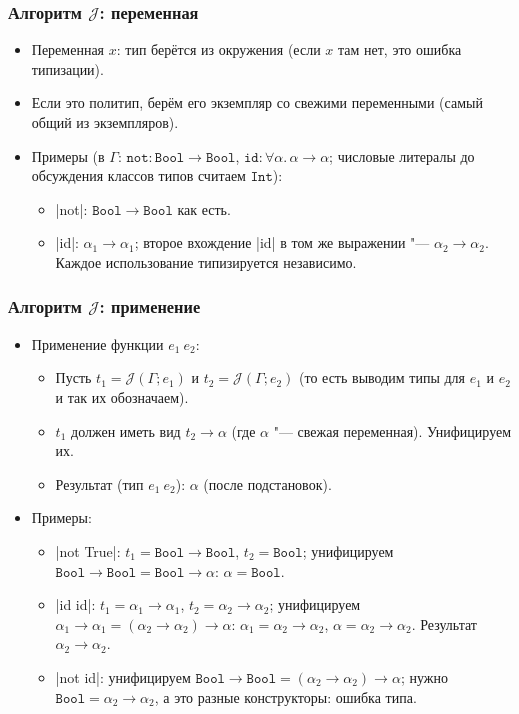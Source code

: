 \documentclass[11pt]{beamer}
\newcommand{\tInt}{\mathtt{Int}}
\newcommand{\tBool}{\mathtt{Bool}}
\newcommand{\J}{\mathcal{J}}
\begin{document}
\begin{frame}[fragile]
  \frametitle{Алгоритм $\J$: переменная}
  \begin{itemize}
    \item Переменная $x$: тип берётся из окружения (если $x$ там нет, это ошибка типизации).
    \item Если это политип, берём его экземпляр со свежими переменными (самый общий из экземпляров).
          \pause
    \item Примеры (в $\Gamma$: $\mathtt{not} : \tBool \to \tBool$, $\mathtt{id} : \forall\alpha.\,\alpha \to \alpha$; числовые литералы до обсуждения классов типов считаем $\tInt$):
          \begin{itemize}
            \item \haskinline|not|: $\tBool \to \tBool$ как есть.
                  \pause
            \item \haskinline|id|: \pause $\alpha_1 \to \alpha_1$; второе вхождение \haskinline|id| в том же выражении "--- $\alpha_2 \to \alpha_2$. Каждое использование типизируется независимо.
          \end{itemize}
  \end{itemize}
\end{frame}

\begin{frame}[fragile]
  \frametitle{Алгоритм $\J$: применение}
  \begin{itemize}
    \item Применение функции $e_1~e_2$:
          \begin{itemize}
            \item Пусть $t_1 = \J(\Gamma; e_1)$ и $t_2 = \J(\Gamma; e_2)$ (то есть выводим типы для $e_1$ и $e_2$ и так их обозначаем).
            \item $t_1$ должен иметь вид $t_2 \to \alpha$ (где $\alpha$ "--- свежая переменная). Унифицируем их.
            \item Результат (тип $e_1~e_2$): \pause $\alpha$ (после подстановок).
          \end{itemize}
          \pause
    \item Примеры:
          \begin{itemize}
            \item \haskinline|not True|: \pause $t_1 = \tBool \to \tBool$, $t_2 = \tBool$; унифицируем $\tBool \to \tBool = \tBool \to \alpha$: \pause $\alpha = \tBool$.
                  \pause
            \item \haskinline|id id|: \pause $t_1 = \alpha_1 \to \alpha_1$, $t_2 = \alpha_2 \to \alpha_2$; унифицируем $\alpha_1 \to \alpha_1 = (\alpha_2 \to \alpha_2) \to \alpha$: \pause $\alpha_1 = \alpha_2 \to \alpha_2$, $\alpha = \alpha_2 \to \alpha_2$. Результат \pause $\alpha_2 \to \alpha_2$.
                  \pause
            \item \haskinline|not id|: \pause унифицируем $\tBool \to \tBool = (\alpha_2 \to \alpha_2) \to \alpha$; \pause нужно $\tBool = \alpha_2 \to \alpha_2$, а это разные конструкторы: ошибка типа.
          \end{itemize}
  \end{itemize}
\end{frame}
\end{document}
